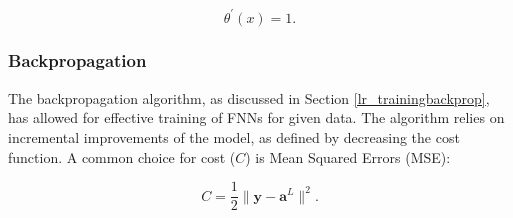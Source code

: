 \documentclass[a4paper,11pt,oneside]{article}
\theoremstyle{plain}
\theoremstyle{definition}
\begin{document}
	\begin{equation}\label{func_linear_prime}
	\theta^\prime(x) = 1.
	\end{equation}
	
	\subsubsection{Backpropagation}\label{imp_backprop}
	
	The backpropagation algorithm, as discussed in Section \ref{lr_trainingbackprop}, has allowed for effective training of FNNs for given data. The algorithm relies on incremental improvements of the model, as defined by decreasing the cost function. A common choice for cost ($C$) is Mean Squared Errors (MSE):
	
	\begin{equation}\label{func_MSE}
	{C} = \frac{1}{2} \rVert \mathbf{y} - \mathbf{a}^L \rVert^2 .
	\end{equation}
	~\\
	
\end{document}
